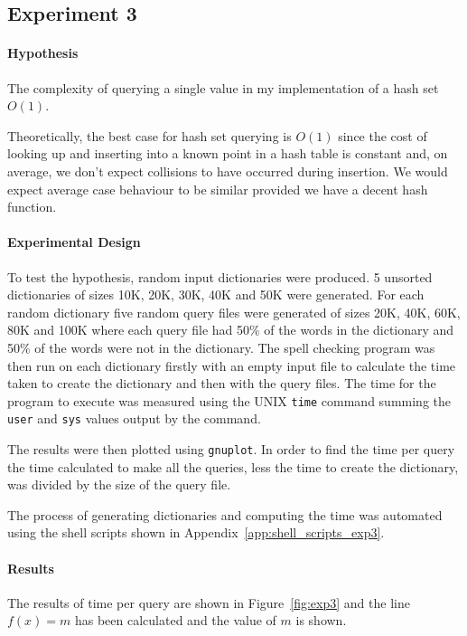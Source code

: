 \subsection{Experiment 3}
\paragraph{Hypothesis} The complexity of querying a single value in my implementation of a hash set $O(1)$. 

Theoretically, the best case for hash set querying is $O(1)$ since the cost of looking up and inserting into a known point in a hash table is constant and, on average, we don't expect collisions to have occurred during insertion.  We would expect average case behaviour to be similar provided we have a decent hash function.  

\paragraph{Experimental Design} To test the hypothesis, random input dictionaries were produced. 5 unsorted dictionaries of sizes 10K, 20K, 30K, 40K and 50K  were generated.  For each random dictionary five random query files were generated of sizes 20K, 40K, 60K, 80K and 100K where each query file had 50\% of the words in the dictionary and 50\% of the words were not in the dictionary. The spell checking program was then run on each dictionary firstly with an empty input file  to calculate the time taken to create the dictionary and then with the query files.  The time for the program to execute was measured using the UNIX \texttt{time} command summing the \texttt{user} and \texttt{sys} values output by the command.  

 The results were then plotted using \texttt{gnuplot}.  In order to find the time per query the time calculated to make all the queries, less the time to create the dictionary, was divided by the size of the query file.  

The process of generating dictionaries and computing the time was automated using the shell scripts shown in Appendix~\ref{app:shell_scripts_exp3}.

\paragraph{Results}  The results of time per query are shown in Figure~\ref{fig:exp3} and the line $f(x) = m$ has been calculated and the value of $m$ is shown.

